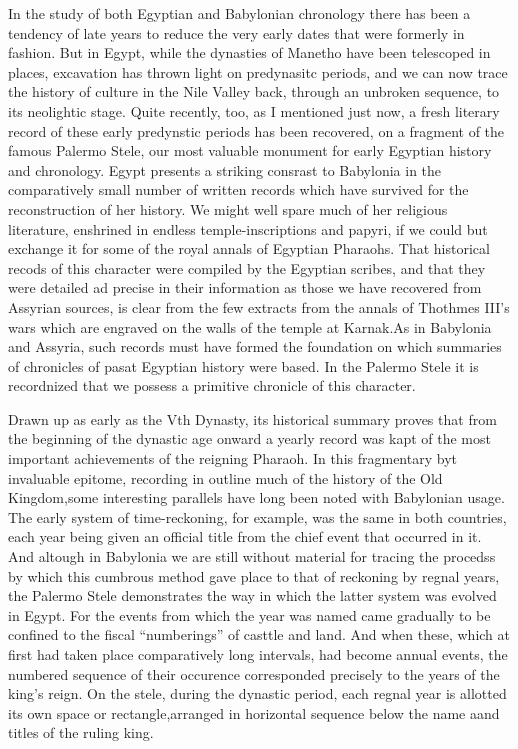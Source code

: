 \documentclass[12pt,oneside]{book}
\begin{document}
In the study of both Egyptian and Babylonian chronology there has been a tendency of late years to reduce the very early dates that were formerly in fashion. But in Egypt, while the dynasties of Manetho have been telescoped in places, excavation has thrown light on predynasitc periods, and we can now trace the history of culture in the Nile Valley back, through an unbroken sequence, to its neolightic stage. Quite recently, too, as I mentioned just now, a fresh literary record of these early predynstic periods has been recovered, on a fragment of the famous Palermo Stele, our most valuable monument for early Egyptian history and chronology. Egypt presents a striking consrast to Babylonia in the comparatively small number of written records which have survived for the reconstruction of her history. We might well spare much of her religious literature, enshrined in endless temple-inscriptions and papyri, if we could but exchange it for some of the royal annals of Egyptian Pharaohs. That historical recods of this character were compiled by the Egyptian scribes, and that they were detailed ad precise in their information as those we have recovered from Assyrian sources, is clear from the few extracts from the annals of Thothmes III's wars which are engraved on the walls of the temple at Karnak.\footnotemark As in Babylonia and Assyria, such records must have formed the foundation on which summaries of chronicles of pasat Egyptian history were based. In the Palermo Stele it is recordnized that we possess a primitive chronicle of this character. \par 


Drawn up as early as the Vth Dynasty, its historical summary proves that from the beginning of the dynastic age onward a yearly record was kapt of the most important achievements of the reigning Pharaoh. In this fragmentary byt invaluable epitome, recording in outline much of the history of the Old Kingdom,\footnotemark some interesting parallels have long been noted with Babylonian usage. The early system of time-reckoning, for example, was the same in both countries, each year being given an official title from the chief event that occurred in it. And altough in Babylonia we are still without material for tracing the procedss by which this cumbrous method gave place to that of reckoning by regnal years, the Palermo Stele demonstrates the way in which the latter system was evolved in Egypt. For the events from which the year was named came gradually to be confined to the fiscal ``numberings'' of casttle and land. And when these, which at first had taken place comparatively long intervals, had become annual events, the numbered sequence of their occurence corresponded precisely to the years of the king's reign. On the stele, during the dynastic period, each regnal year is allotted its own space or rectangle,\footnotemark arranged in horizontal sequence below the name aand titles of the ruling king. \par 
\end{document}
